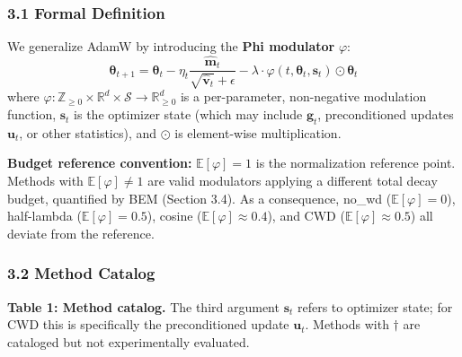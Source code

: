 \documentclass[
]{article}
\begin{document}
\hypertarget{formal-definition}{%
\subsubsection{3.1 Formal Definition}\label{formal-definition}}

We generalize AdamW by introducing the \textbf{Phi modulator}
\(\varphi\):
\[\boldsymbol{\theta}_{t+1} = \boldsymbol{\theta}_t - \eta_t \frac{\hat{\mathbf{m}}_t}{\sqrt{\hat{\mathbf{v}}_t} + \epsilon} - \lambda \cdot \varphi(t, \boldsymbol{\theta}_t, \mathbf{s}_t) \odot \boldsymbol{\theta}_t\]
where
\(\varphi : \mathbb{Z}_{\geq 0} \times \mathbb{R}^d \times \mathcal{S} \to \mathbb{R}^d_{\geq 0}\)
is a per-parameter, non-negative modulation function, \(\mathbf{s}_t\)
is the optimizer state (which may include \(\mathbf{g}_t\),
preconditioned updates \(\mathbf{u}_t\), or other statistics), and
\(\odot\) is element-wise multiplication.

\textbf{Budget reference convention:} \(\mathbb{E}[\varphi] = 1\) is the
normalization reference point. Methods with
\(\mathbb{E}[\varphi] \neq 1\) are valid modulators applying a different
total decay budget, quantified by BEM (Section 3.4). As a consequence,
no\_wd (\(\mathbb{E}[\varphi] = 0\)), half-lambda
(\(\mathbb{E}[\varphi] = 0.5\)), cosine
(\(\mathbb{E}[\varphi] \approx 0.4\)), and CWD
(\(\mathbb{E}[\varphi] \approx 0.5\)) all deviate from the reference.

\hypertarget{method-catalog}{%
\subsubsection{3.2 Method Catalog}\label{method-catalog}}

\textbf{Table 1: Method catalog.} The third argument \(\mathbf{s}_t\)
refers to optimizer state; for CWD this is specifically the
preconditioned update \(\mathbf{u}_t\). Methods with \(\dagger\) are
cataloged but not experimentally evaluated.
\end{document}
